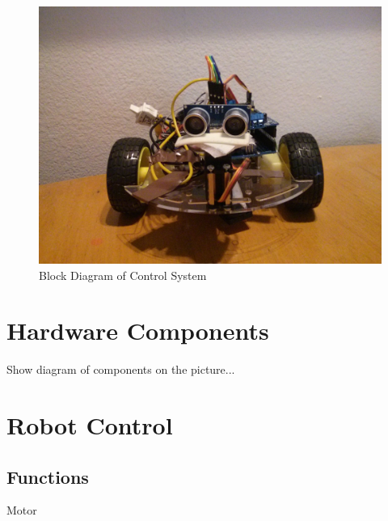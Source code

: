\documentclass[11pt]{article}
\begin{document}
	\begin{figure}[h]\centering
	\includegraphics[height=0.7\textwidth]{images/bot_front.jpg}
	\caption{Block Diagram of Control System}
		\label{diagram}
	\end{figure}









\section{Hardware Components}
Show diagram of components on the picture...



\section{Robot Control}

\subsection{Functions}
Motor
\end{document}
